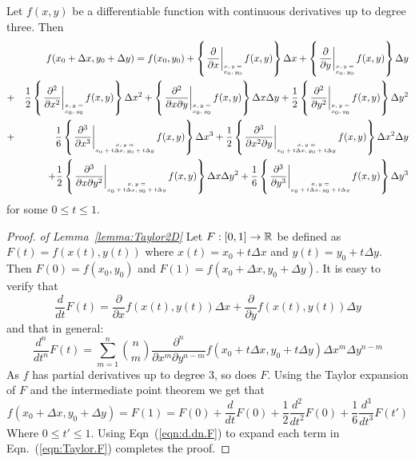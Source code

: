 \documentclass[anon,12pt]{colt2024} %
\begin{document}
\newcommand{\Dx}{\Delta x}
\newcommand{\Dy}{\Delta y}
\begin{lemma} \label{lemma:Taylor2D}
Let $f(x,y)$ be a differentiable function with continuous derivatives
up to degree three. Then
\begin{eqnarray}
  &&f(x_0+\Dx,y_0+\Dy) = f(x_0,y_0)
  + \atI{\frac{\partial}{\partial x}} \Dx 
  + \atI{\frac{\partial}{\partial y}} \Dy \\
  &+&\frac{1}{2} \atI{\frac{\partial^2}{\partial x^2}} \Dx^2
      +\atI{\frac{\partial^2}{\partial x\partial y}} \Dx\Dy
      +\frac{1}{2} \atI{\frac{\partial^2}{\partial y^2}} \Dy^2\\
  &+&\frac{1}{6} \atII{\frac{\partial^3}{\partial x^3}} \Dx^3
      +\frac{1}{2} \atII{\frac{\partial^3}{\partial x^2 \partial y}} \Dx^2\Dy\\
  &&+ \frac{1}{2} \atII{\frac{\partial^3}{\partial x \partial y^2}} \Dx\Dy^2
    + \frac{1}{6} \atII{\frac{\partial^3}{\partial y^3}} \Dy^3
\end{eqnarray}
for some $0\leq t \leq 1$.
\end{lemma}
\begin{proof} {\em of Lemma~\ref{lemma:Taylor2D}} 
Let $F:[0,1] \to \mathbb{R}$ be defined as  $F(t)=f(x(t),y(t))$ where
$x(t) = x_0+t\Dx$ and $y(t)=y_0+t\Dy$. Then $F(0)=f(x_0,y_0)$ and
$F(1)=f(x_0+\Dx,y_0+\Dy)$. It is easy to verify that
$$ \frac{d}{dt}F(t)
=\frac{\partial}{\partial x} f(x(t),y(t))\Dx
+ \frac{\partial}{\partial y} f(x(t),y(t))\Dy
$$
and that in general:
\begin{equation} \label{eqn:d.dn.F}
\frac{d^n}{d t^n} F(t) = \sum_{m=1}^n {n \choose m}
\frac{\partial^n}{\partial x^m \partial y^{n-m}} f(x_0+t \Dx,y_0+t\Dy)
\Dx^m \Dy^{n-m}
\end{equation}
As $f$ has partial derivatives up to degree 3, so does $F$. Using the
Taylor expansion of $F$ and the intermediate point theorem we get that
\begin{equation} \label{eqn:Taylor.F}
  f(x_0+\Dx,y_0+\Dy) = F(1) = F(0)+\frac{d}{dt}F(0)
  +\frac{1}{2}\frac{d^2}{dt^2}F(0)
  +\frac{1}{6}\frac{d^3}{dt^3}F(t')
\end{equation}
Where $0 \leq t' \leq 1$. Using Eqn~(\ref{eqn:d.dn.F}) to expand each
term in Eqn.~(\ref{eqn:Taylor.F}) completes the proof.
\end{proof}
\end{document}

